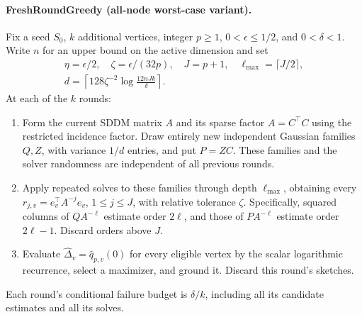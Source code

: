\paragraph{FreshRoundGreedy (all-node worst-case variant).}
Fix a seed $S_0$, $k$ additional vertices, integer $p\geq1$,
$0<\epsilon\leq1/2$, and $0<\delta<1$. Write $n$ for an upper
bound on the active dimension and set
\begin{equation}\label{eq:freshparams}
\begin{gathered}
 \eta=\epsilon/2,\quad\zeta=\epsilon/(32p),\quad
 J=p+1,\quad \ell_{\max}=\lceil J/2\rceil,\\
 d=\left\lceil128\zeta^{-2}\log\frac{12nJk}{\delta}\right\rceil.
\end{gathered}
\end{equation}
At each of the $k$ rounds:
\begin{enumerate}
\item Form the current SDDM matrix $A$ and its sparse factor
$A=C^\top C$ using the restricted incidence factor. Draw entirely new independent Gaussian
families $Q,Z$, with variance $1/d$ entries, and put $P=ZC$.
These families and the solver randomness are independent of all
previous rounds.
\item Apply repeated solves to these families through depth
$\ell_{\max}$, obtaining every $r_{j,v}=e_v^\top A^{-j}e_v$, $1\leq j\leq J$,
with relative tolerance $\zeta$. Specifically, squared columns of
$QA^{-\ell}$ estimate order $2\ell$, and those of $PA^{-\ell}$
estimate order $2\ell-1$. Discard orders above $J$.
\item Evaluate $\widehat\Delta_v=\widehat q_{p,v}(0)$ for every
eligible vertex by the scalar logarithmic recurrence, select a
maximizer, and ground it. Discard this round's sketches.
\end{enumerate}
Each round's conditional failure budget is $\delta/k$, including
all its candidate estimates and all its solves.

